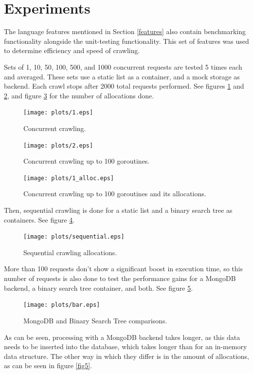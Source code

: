 \documentclass[]{article}
\begin{document}
\section{Experiments}\label{experiments}

The language features mentioned in Section \ref{features} also contain
benchmarking functionality alongside the unit-testing functionality.
This set of features was used to determine efficiency and speed of
crawling.

Sets of 1, 10, 50, 100, 500, and 1000 concurrent requests are tested 5
times each and averaged. These sets use a static list as a container,
and a mock storage as backend. Each crawl stops after 2000 total
requests performed. See figures \ref{fig2} and \ref{fig3}, and figure
\ref{fig6} for the number of allocations done.

\begin{figure}
\centering
\texttt{[image: plots/1.eps]}
\caption{Concurrent crawling.}\label{fig2}
\end{figure}

\begin{figure}
\centering
\texttt{[image: plots/2.eps]}
\caption{Concurrent crawling up to 100 goroutines.}\label{fig3}
\end{figure}

\begin{figure}
\centering
\texttt{[image: plots/1\_alloc.eps]}
\caption{Concurrent crawling up to 100 goroutines and its
allocations.}\label{fig6}
\end{figure}

Then, sequential crawling is done for a static list and a binary search
tree as containers. See figure \ref{fig1}.

\begin{figure}
\centering
\texttt{[image: plots/sequential.eps]}
\caption{Sequential crawling allocations.}\label{fig1}
\end{figure}

More than 100 requests don't show a significant boost in execution time,
so this number of requests is also done to test the performance gains
for a MongoDB backend, a binary search tree container, and both. See
figure \ref{fig4}.

\begin{figure}
\centering
\texttt{[image: plots/bar.eps]}
\caption{MongoDB and Binary Search Tree comparisons.}\label{fig4}
\end{figure}

As can be seen, processing with a MongoDB backend takes longer, as this
data needs to be inserted into the database, which takes longer than for
an in-memory data structure. The other way in which they differ is in
the amount of allocations, as can be seen in figure \ref{fig5}.
\end{document}
